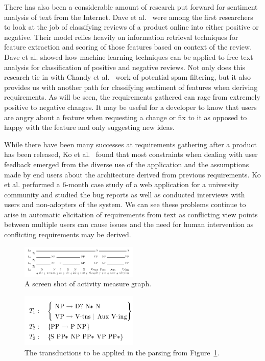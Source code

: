 \documentclass[conference]{IEEEtran}
\begin{document}
There has also been a considerable amount of research put forward for sentiment analysis of
text from the Internet. Dave et al.~\cite{Dave:2003:MPG} were among the first researchers
to look at the job of classifying reviews of a product online into either positive or negative.
Their model relies heavily on information retrieval techniques for feature extraction and scoring
of those features based on context of the review. Dave et al. showed how machine learning techniques
can be applied to free text analysis for classification of positive and negative reviews. Not only
does this research tie in with Chandy et al.~\cite{Chandy:2012:ISI} work of potential spam filtering,
but it also provides us with another path for classifying sentiment of features when deriving
requirements. As will be seen, the requirements gathered can rage from extremely positive to
negative changes. It may be useful for a developer to know that users are angry about a feature
when requesting a change or fix to it as opposed to happy with the feature and only suggesting new ideas.

While there have been many successes at requirements gathering after a product has been released,
Ko et al.~\cite{Ko:2011:CSP} found that most constraints when dealing with user feedback emerged
from the diverse use of the application and the assumptions made by end users about the architecture
derived from previous requirements. Ko et al. performed a 6-month case study of a web application for
a university community and studied the bug reports as well as conducted interviews with users and
non-adopters of the system. We can see these problems continue to arise in automatic elicitation of
requirements from text as conflicting view points between multiple users can cause issues and the need
for human intervention as conflicting requirements may be derived.

\begin{figure}[h]
\centering
\includegraphics[width=0.5\textwidth]{images/parsing.png}
\caption{A screen shot of activity measure graph.\label{fig:parsing}}
\end{figure}

\begin{figure}[h]
\centering
\includegraphics[width=0.5\textwidth]{images/rules.png}
\caption{The transductions to be applied in the parsing from Figure~\ref{fig:parsing}.
\label{fig:rules}}
\end{figure}
\end{document}
